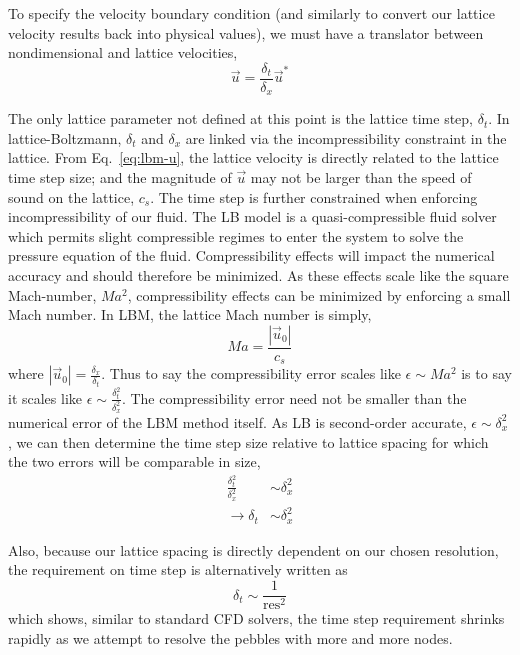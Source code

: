 To specify the velocity boundary condition (and similarly to convert our lattice velocity results back into physical values), we must have a translator between nondimensional and lattice velocities,
\begin{equation}\label{eq:lbm-u}
	\vec{u} = \frac{\delta_t}{\delta_x}\vec{u}^*
\end{equation}

The only lattice parameter not defined at this point is the lattice time step, $\delta_t$. In lattice-Boltzmann, $\delta_t$ and $\delta_x$ are linked via the incompressibility constraint in the lattice. From Eq.~\ref{eq:lbm-u}, the lattice velocity is directly related to the lattice time step size; and the magnitude of $\vec{u}$ may not be larger than the speed of sound on the lattice, $c_s$. The time step is further constrained when enforcing incompressibility of our fluid. The LB model is a quasi-compressible fluid solver which permits slight compressible regimes to enter the system to solve the pressure equation of the fluid. Compressibility effects will impact the numerical accuracy and should therefore be minimized. As these effects scale like the square Mach-number, $Ma^2$, compressibility effects can be minimized by enforcing a small Mach number. In LBM, the lattice Mach number is simply,
\begin{equation}
 	Ma = \frac{|\vec{u}_0|}{c_s}
\end{equation}
where $|\vec{u}_0| = \frac{\delta_x}{\delta_t}$. Thus to say the compressibility error scales like $\epsilon \sim Ma^2$ is to say it scales like $\epsilon \sim \frac{\delta_t^2}{\delta_x^2}$. The compressibility error need not be smaller than the numerical error of the LBM method itself. As LB is second-order accurate\cite{succi2001lattice}, $\epsilon \sim \delta_x^2$, we can then determine the time step size relative to lattice spacing for which the two errors will be comparable in size,
\begin{align*}
	\frac{\delta_t^2}{\delta_x^2} &\sim \delta_x^2\\
	\rightarrow \delta_t &\sim \delta_x^2
\end{align*}

Also, because our lattice spacing is directly dependent on our chosen resolution, the requirement on time step is alternatively written as
\begin{equation}
	\delta_t \sim \frac{1}{\text{res}^2}
\end{equation}
which shows, similar to standard CFD solvers, the time step requirement shrinks rapidly as we attempt to resolve the pebbles with more and more nodes.

